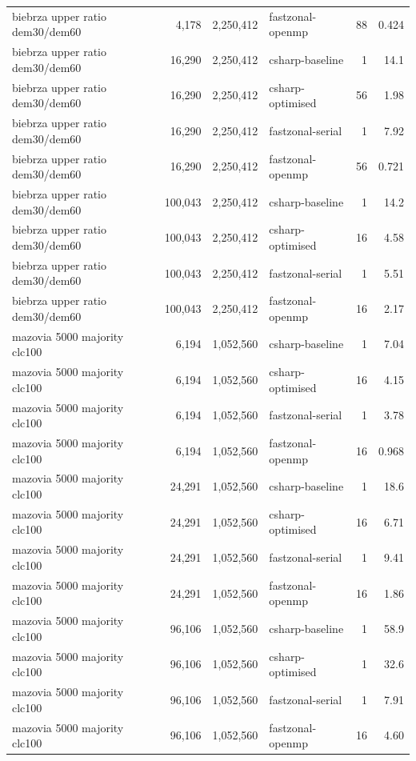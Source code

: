 \begin{tabular}{lrrlrr}
biebrza upper ratio dem30/dem60 & 4,178 & 2,250,412 & fastzonal-openmp & 88 & 0.424 \\
biebrza upper ratio dem30/dem60 & 16,290 & 2,250,412 & csharp-baseline & 1 & 14.1 \\
biebrza upper ratio dem30/dem60 & 16,290 & 2,250,412 & csharp-optimised & 56 & 1.98 \\
biebrza upper ratio dem30/dem60 & 16,290 & 2,250,412 & fastzonal-serial & 1 & 7.92 \\
biebrza upper ratio dem30/dem60 & 16,290 & 2,250,412 & fastzonal-openmp & 56 & 0.721 \\
biebrza upper ratio dem30/dem60 & 100,043 & 2,250,412 & csharp-baseline & 1 & 14.2 \\
biebrza upper ratio dem30/dem60 & 100,043 & 2,250,412 & csharp-optimised & 16 & 4.58 \\
biebrza upper ratio dem30/dem60 & 100,043 & 2,250,412 & fastzonal-serial & 1 & 5.51 \\
biebrza upper ratio dem30/dem60 & 100,043 & 2,250,412 & fastzonal-openmp & 16 & 2.17 \\
mazovia 5000 majority clc100 & 6,194 & 1,052,560 & csharp-baseline & 1 & 7.04 \\
mazovia 5000 majority clc100 & 6,194 & 1,052,560 & csharp-optimised & 16 & 4.15 \\
mazovia 5000 majority clc100 & 6,194 & 1,052,560 & fastzonal-serial & 1 & 3.78 \\
mazovia 5000 majority clc100 & 6,194 & 1,052,560 & fastzonal-openmp & 16 & 0.968 \\
mazovia 5000 majority clc100 & 24,291 & 1,052,560 & csharp-baseline & 1 & 18.6 \\
mazovia 5000 majority clc100 & 24,291 & 1,052,560 & csharp-optimised & 16 & 6.71 \\
mazovia 5000 majority clc100 & 24,291 & 1,052,560 & fastzonal-serial & 1 & 9.41 \\
mazovia 5000 majority clc100 & 24,291 & 1,052,560 & fastzonal-openmp & 16 & 1.86 \\
mazovia 5000 majority clc100 & 96,106 & 1,052,560 & csharp-baseline & 1 & 58.9 \\
mazovia 5000 majority clc100 & 96,106 & 1,052,560 & csharp-optimised & 1 & 32.6 \\
mazovia 5000 majority clc100 & 96,106 & 1,052,560 & fastzonal-serial & 1 & 7.91 \\
mazovia 5000 majority clc100 & 96,106 & 1,052,560 & fastzonal-openmp & 16 & 4.60 \\

\end{tabular}
